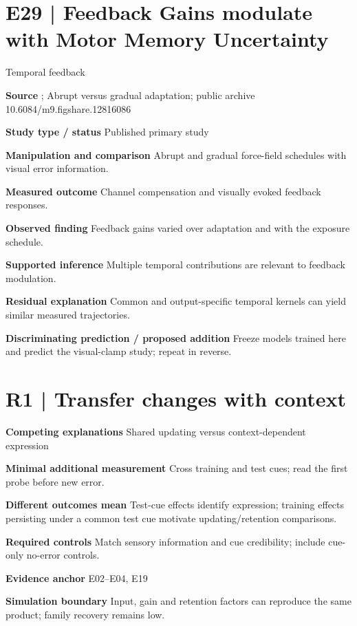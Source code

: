 \documentclass[11pt,a4paper]{article}
\begin{document}
\clearpage\section{E29 | Feedback Gains modulate with Motor Memory Uncertainty}
{\small\sffamily\color{navy} Temporal feedback}\par
\textbf{Source} \cite{franklin2021}; Abrupt versus gradual adaptation; public archive 10.6084/m9.figshare.12816086\par
\textbf{Study type / status} Published primary study\par
\textbf{Manipulation and comparison} Abrupt and gradual force-field schedules with visual error information.\par
\textbf{Measured outcome} Channel compensation and visually evoked feedback responses.\par
\textbf{Observed finding} Feedback gains varied over adaptation and with the exposure schedule.\par
\textbf{Supported inference} Multiple temporal contributions are relevant to feedback modulation.\par
\textbf{Residual explanation} Common and output-specific temporal kernels can yield similar measured trajectories.\par
\textbf{Discriminating prediction / proposed addition} Freeze models trained here and predict the visual-clamp study; repeat in reverse.\par
\clearpage\section{R1 | Transfer changes with context}
\medskip\textbf{Competing explanations} Shared updating versus context-dependent expression\par
\medskip\textbf{Minimal additional measurement} Cross training and test cues; read the first probe before new error.\par
\medskip\textbf{Different outcomes mean} Test-cue effects identify expression; training effects persisting under a common test cue motivate updating/retention comparisons.\par
\medskip\textbf{Required controls} Match sensory information and cue credibility; include cue-only no-error controls.\par
\medskip\textbf{Evidence anchor} E02--E04, E19\par
\medskip\textbf{Simulation boundary} Input, gain and retention factors can reproduce the same product; family recovery remains low.\par
\end{document}

